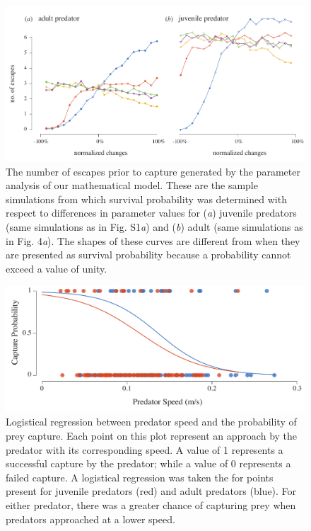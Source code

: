 \documentclass[11pt]{article}
\begin{document}
\begin{figure}[!h]
\centering
	\includegraphics[width=5.5in]{supp_noescape}
\caption{The number of escapes prior to capture generated by the parameter analysis of our mathematical model.
These are the sample simulations from which survival probability was determined with respect to differences in parameter values for (\textit{a}) juvenile predators (same simulations as in Fig. S1\textit{a}) and (\textit{b}) adult (same simulations as in Fig. 4\textit{a}).
The shapes of these curves are different from when they are presented as survival probability because a probability cannot exceed a value of unity.
}
\label{fig_sense}
\end{figure}

\begin{figure}[!h]
\centering
	\includegraphics[width=5.5in]{supp_pred_speed_vs_capture}
\caption{Logistical regression between predator speed and the probability of prey capture.
Each point on this plot represent an approach by the predator with its corresponding speed.
A value of 1 represents a successful capture by the predator; while a value of 0 represents a failed capture. 
A logistical regression was taken the for points present for juvenile predators (red) and adult predators (blue).
For either predator, there was a greater chance of capturing prey when predators approached at a lower speed.
}
\label{fig_sense}
\end{figure}
\end{document}
